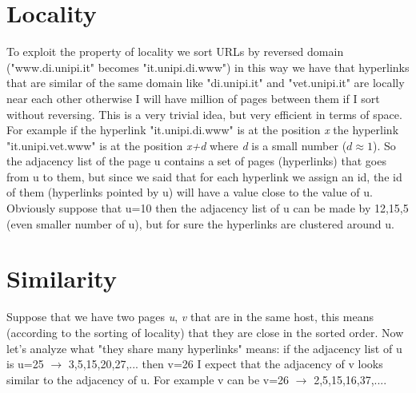 \section{Locality}
To exploit the property of locality we sort URLs by reversed domain ("www.di.unipi.it" becomes "it.unipi.di.www") in this way we have that hyperlinks that are similar of the same domain like "di.unipi.it" and "vet.unipi.it" are locally near each other otherwise I will have million of pages between them if I sort without reversing.\newline
This is a very trivial idea, but very efficient in terms of space. For example if the hyperlink "it.unipi.di.www" is at the position \textit{x} the hyperlink "it.unipi.vet.www" is at the position \textit{x+d} where \textit{d} is a small number ($d \approx 1$).\newline
So the adjacency list of the page u contains a set of pages (hyperlinks) that goes from u to them, but since we said that for each hyperlink we assign an id, the id of them (hyperlinks pointed by u) will have a value close to the value of u. Obviously suppose that u=10 then the adjacency list of u can be made by 12,15,5 (even smaller number of u), but for sure the hyperlinks are clustered around u.
\section{Similarity}
Suppose that we have two pages \textit{u}, \textit{v} that are in the same host, this means (according to the sorting of locality) that they are close in the sorted order.\newline
Now let's analyze what "they share many hyperlinks" means: if the adjacency list of u is u=25 $\to$ 3,5,15,20,27,... then v=26 I expect that the adjacency of v looks similar to the adjacency of u.
For example v can be v=26 $\to$ 2,5,15,16,37,....\newline

